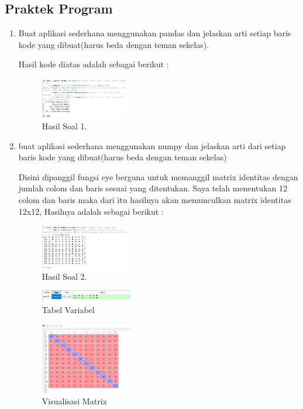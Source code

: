 \subsection{Praktek Program}
\begin{enumerate}
	\item Buat aplikasi sederhana menggunakan pandas dan jelaskan arti setiap baris kode yang dibuat(harus beda dengan teman sekelas).
	\hfill\break
	
	Hasil kode diatas adalah sebagai berikut :
	\begin{figure}[H]
	\centering
		\includegraphics[width=4cm]{figures/1174096/tugas3/hasil1.PNG}
		\caption{Hasil Soal 1.}
	\end{figure}

	\item buat aplikasi sederhana menggunakan numpy dan jelaskan arti dari setiap baris kode yang dibuat(harus beda dengan teman sekelas)
	\hfill\break
	
	Disini dipanggil fungsi eye berguna untuk memanggil matrix identitas dengan jumlah colom dan baris sesuai yang ditentukan. Saya telah menentukan 12 colom dan baris maka dari itu hasilnya akan memunculkan matrix identitas 12x12, Hasilnya adalah sebagai berikut :
	\begin{figure}[H]
	\centering
		\includegraphics[width=4cm]{figures/1174096/tugas3/hasil2.PNG}
		\caption{Hasil Soal 2.}
	\end{figure}
    \begin{figure}[H]
	\centering
		\includegraphics[width=4cm]{figures/1174096/tugas3/hasil2var.PNG}
		\caption{Tabel Variabel}
	\end{figure}
    \begin{figure}[H]
	\centering
		\includegraphics[width=4cm]{figures/1174096/tugas3/hasil2var2.PNG}
		\caption{Visualisasi Matrix}
	\end{figure}
	

\end{enumerate}
